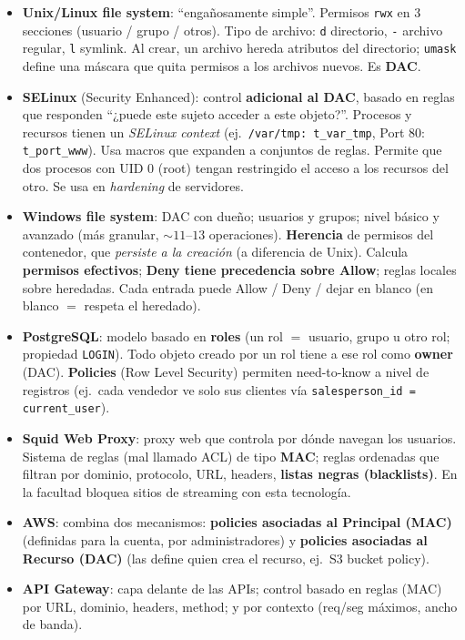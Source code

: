 \documentclass[../main.tex]{subfiles}
\begin{document}
\begin{itemize}[nosep]
  \item \textbf{Unix/Linux file system}: ``engañosamente simple''. Permisos \texttt{rwx} en 3 secciones (usuario / grupo / otros). Tipo de archivo: \texttt{d} directorio, \texttt{-} archivo regular, \texttt{l} symlink. Al crear, un archivo hereda atributos del directorio; \texttt{umask} define una máscara que quita permisos a los archivos nuevos. Es \textbf{DAC}.
  \item \textbf{SELinux} (Security Enhanced): control \textbf{adicional al DAC}, basado en reglas que responden ``¿puede este sujeto acceder a este objeto?''. Procesos y recursos tienen un \emph{SELinux context} (ej.\ \texttt{/var/tmp: t\_var\_tmp}, Port 80: \texttt{t\_port\_www}). Usa macros que expanden a conjuntos de reglas. Permite que dos procesos con UID 0 (root) tengan restringido el acceso a los recursos del otro. Se usa en \emph{hardening} de servidores.
  \item \textbf{Windows file system}: DAC con dueño; usuarios y grupos; nivel básico y avanzado (más granular, $\sim 11$--$13$ operaciones). \textbf{Herencia} de permisos del contenedor, que \emph{persiste a la creación} (a diferencia de Unix). Calcula \textbf{permisos efectivos}; \textbf{Deny tiene precedencia sobre Allow}; reglas locales sobre heredadas. Cada entrada puede Allow / Deny / dejar en blanco (en blanco $=$ respeta el heredado).
  \item \textbf{PostgreSQL}: modelo basado en \textbf{roles} (un rol $=$ usuario, grupo u otro rol; propiedad \texttt{LOGIN}). Todo objeto creado por un rol tiene a ese rol como \textbf{owner} (DAC). \textbf{Policies} (Row Level Security) permiten need-to-know a nivel de registros (ej.\ cada vendedor ve solo sus clientes vía \texttt{salesperson\_id = current\_user}).
  \item \textbf{Squid Web Proxy}: proxy web que controla por dónde navegan los usuarios. Sistema de reglas (mal llamado ACL) de tipo \textbf{MAC}; reglas ordenadas que filtran por dominio, protocolo, URL, headers, \textbf{listas negras (blacklists)}. En la facultad bloquea sitios de streaming con esta tecnología.
  \item \textbf{AWS}: combina dos mecanismos: \textbf{policies asociadas al Principal (MAC)} (definidas para la cuenta, por administradores) y \textbf{policies asociadas al Recurso (DAC)} (las define quien crea el recurso, ej.\ S3 bucket policy).
  \item \textbf{API Gateway}: capa delante de las APIs; control basado en reglas (MAC) por URL, dominio, headers, method; y por contexto (req/seg máximos, ancho de banda).
\end{itemize}
\end{document}
